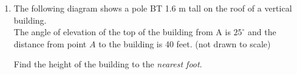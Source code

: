 \documentclass[12pt, twoside]{article}
\begin{document}
\begin{enumerate}

\newpage
\item The following diagram shows a pole BT 1.6 m tall on the roof of a vertical building. \\[0.25cm]
  The angle of elevation of the top of the building from A is  
  $25^\circ$ and the distance from point $A$ to the building is 40 feet. (not drawn to scale)
    \begin{center}
      \end{center}
      Find the height of the building to the \emph{nearest foot}.

\end{enumerate}
\end{document}

